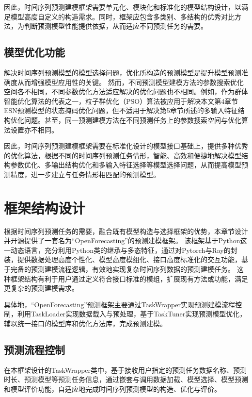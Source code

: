 因此，时间序列预测建模框架需要单元化、模块化和标准化的模型结构设计，以满足模型高度自定义的构造需求。同时，框架应包含多类别、多结构的优秀对比方法，为判断预测模型性能提供依据，从而适应不同预测任务的需要。

\subsection{模型优化功能}

解决时间序列预测模型的模型选择问题，优化所构造的预测模型是提升模型预测准确度从而增强模型应用性的关键。
然而，不同预测模型建模方法的参数搜索优化空间各不相同，不同参数优化方法适应解决的优化问题也不相同。例如，作为群体智能优化算法的代表之一，粒子群优化（PSO）算法被应用于解决本文第4章节ESN预测模型的状态掩码优化问题，但不适用于解决第5章节所述的多输入特征结构优化问题。甚至，同一预测建模方法在不同预测任务上的参数搜索空间与优化算法设置亦不相同。

因此，时间序列预测建模框架需要在标准化设计的模型接口基础上，提供多种优秀的优化算法，根据不同的时间序列预测任务情形，智能、高效和便捷地解决模型结构参数优化、多输出结构优化和多输入特征选择等模型选择问题，从而提高模型预测精度，进一步建立与任务情形相匹配的预测模型。


\section{框架结构设计}
根据时间序列预测任务的需要，融合既有模型构造与选择框架的优势\cite{paszkePytorch2019,liawTune2018}，本章节设计并开源提供了一套名为“OpenForecasting”的预测建模框架。
该框架基于Python这一动态语言，充分利用Python类的继承与多态特征，通过对Pytorch与Ray的封装，提供数据处理高度个性化、模型高度模组化、接口高度标准化的交互功能，基于完备的预测建模流程逻辑，有效地实现复杂时间序列数据的预测建模任务。
这种框架结构有利于用户通过定义符合接口标准的模组，扩展现有方法或功能，满足更复杂的预测建模需求。


具体地，“OpenForecasting”预测框架主要通过TaskWrapper实现预测建模流程控制，利用TaskLoader实现数据载入与预处理，基于TaskTuner实现预测模型优化，辅以统一接口的模型库和优化方法库，完成预测建模。

\subsection{预测流程控制}
在本框架设计的TaskWrapper类中，基于接收用户指定的预测任务数据名称、预测时长、预测模型等预测任务信息，通过嵌套与调用数据加载、模型选择、模型预测和模型评价功能，自适应地完成时间序列预测模型的构造、优化与评价。


